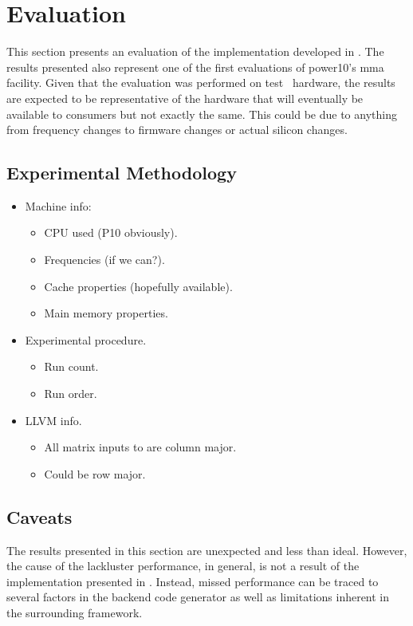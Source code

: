 \documentclass[\main/thesis.tex]{subfiles}
\begin{document}
\chapter{Evaluation}
\label{cha:evaluation}
This section presents an evaluation of the implementation developed in .
The results presented also represent one of the first evaluations of \gls{power10}'s \gls{mma} facility.
Given that the evaluation was performed on test~ hardware, the results are expected to be representative of the hardware that will eventually be available to consumers but not exactly the same.
This could be due to anything from frequency changes to firmware changes or actual silicon changes.

\section{Experimental Methodology}
\begin{itemize}
  \item
    Machine info:
    \begin{itemize}
      \item CPU used (P10 obviously).
      \item Frequencies (if we can?).
      \item Cache properties (hopefully available).
      \item Main memory properties.
    \end{itemize}
  \item
    Experimental procedure.
    \begin{itemize}
      \item Run count.
      \item Run order.
    \end{itemize}
  \item
    LLVM info.
      \begin{itemize}
        \item All matrix inputs to  are column major.
        \item Could be row major.
      \end{itemize}
\end{itemize}

\section{Caveats}
The results presented in this section are unexpected and less than ideal.
However, the cause of the lackluster performance, in general, is not a result of the implementation presented in .
Instead, missed performance can be traced to several factors in the backend code generator as well as limitations inherent in the surrounding framework.
\end{document}

